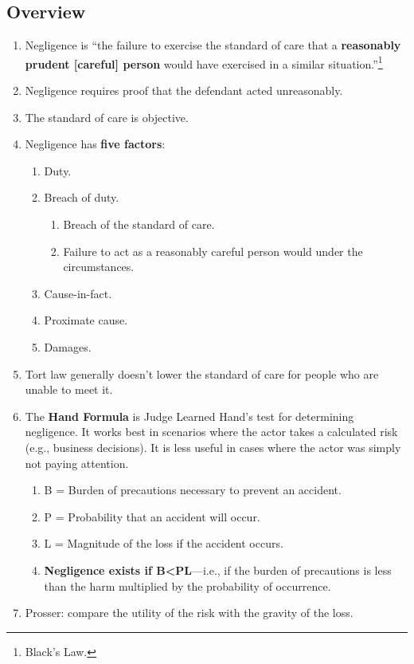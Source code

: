 \subsection{Overview}

\begin{enumerate}
    \item Negligence is ``the failure to exercise the standard of care that a 
    \textbf{reasonably prudent [careful] person} would have exercised in a 
    similar situation.''\footnote{Black's Law.}
    \item Negligence requires proof that the defendant acted unreasonably.
    \item The standard of care is objective.
    \item Negligence has \textbf{five factors}:
    \begin{enumerate}
        \item Duty.
        \item Breach of duty.
        \begin{enumerate}
            \item Breach of the standard of care.
            \item Failure to act as a reasonably careful person would under 
            the circumstances.
        \end{enumerate}
        \item Cause-in-fact.
        \item Proximate cause.
        \item Damages.
    \end{enumerate}
    \item Tort law generally doesn't lower the standard of care for people who 
    are unable to meet it.
    \item The \textbf{Hand Formula} is Judge Learned Hand's test for determining 
    negligence. It works best in scenarios where the actor takes a calculated 
    risk (e.g., business decisions). It is less useful in cases where the 
    actor was simply not paying attention.
    \begin{enumerate}
        \item B = Burden of precautions necessary to prevent an accident.
        \item P = Probability that an accident will occur.
        \item L = Magnitude of the loss if the accident occurs.
        \item \textbf{Negligence exists if B\textless PL}---i.e., if the burden of 
        precautions is less than the harm multiplied by the probability of 
        occurrence.
    \end{enumerate}
    \item Prosser: compare the utility of the risk with the gravity of the 
    loss.
\end{enumerate}

